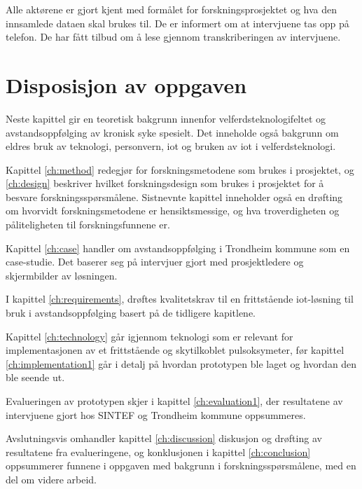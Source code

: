 Alle aktørene er gjort kjent med formålet for forskningsprosjektet og hva den innsamlede dataen skal brukes til. De er informert om at
intervjuene tas opp på telefon. De har fått tilbud om å lese gjennom transkriberingen av intervjuene.

\section{Disposisjon av oppgaven}
Neste kapittel gir en teoretisk bakgrunn innenfor velferdsteknologifeltet og avstandsoppfølging av kronisk syke spesielt.
Det inneholde også bakgrunn om eldres bruk av teknologi, personvern, \gls{iot} og bruken av \gls{iot} i velferdsteknologi.

Kapittel \ref{ch:method} redegjør for forskningsmetodene som brukes i prosjektet, og \ref{ch:design} beskriver hvilket forskningsdesign som brukes i prosjektet for å besvare forskningsspørsmålene.
Sistnevnte kapittel inneholder også en drøfting om hvorvidt forskningsmetodene er hensiktsmessige, og hva troverdigheten og påliteligheten til forskningsfunnene er.

Kapittel \ref{ch:case} handler om avstandsoppfølging i Trondheim kommune som en case-studie. Det baserer seg på intervjuer gjort med
prosjektledere og skjermbilder av løsningen.

I kapittel \ref{ch:requirements}, drøftes kvalitetskrav til en frittstående \gls{iot}-løsning til bruk i avstandsoppfølging basert på de tidligere
kapitlene.

Kapittel \ref{ch:technology} går igjennom teknologi som er relevant for implementasjonen av et frittstående og skytilkoblet pulsoksymeter,
før kapittel \ref{ch:implementation1} går i detalj på hvordan prototypen ble laget og hvordan den ble seende ut.

Evalueringen av prototypen skjer i kapittel \ref{ch:evaluation1}, der resultatene av intervjuene gjort hos SINTEF og Trondheim kommune oppsummeres.

Avslutningsvis omhandler kapittel \ref{ch:discussion} diskusjon og drøfting av resultatene fra evalueringene, og konklusjonen i kapittel \ref{ch:conclusion}
oppsummerer funnene i oppgaven med bakgrunn i forskningsspørsmålene, med en del om videre arbeid.
